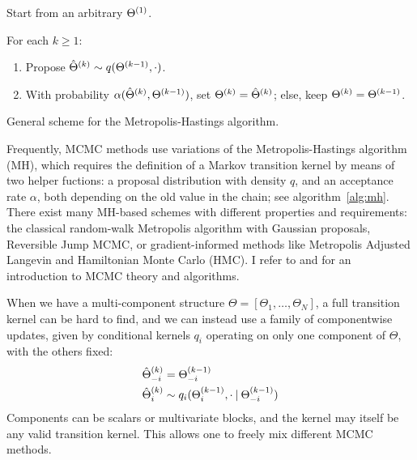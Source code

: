 \begin{algorithm}
  \begin{myalgorithmic}
  \item Start from an arbitrary \(\kth[1]{\Theta}\).
  \item For each \(k \ge 1\):
    \begin{enumerate}
    \item Propose \(\kth[k]{\hat{\Theta}} \sim q(\kth[k-1]{\Theta}, \cdot)\).
    \item With probability \(\alpha(\kth[k]{\hat{\Theta}}, \kth[k-1]{\Theta})\), set
      \(\kth[k]{\Theta} = \kth[k]{\hat{\Theta}}\); else, keep \(\kth[k]{\Theta} = \kth[k-1]{\Theta}\).
    \end{enumerate}
  \end{myalgorithmic}
  \caption{General scheme for the Metropolis-Hastings algorithm.\label{alg:mh}}
\end{algorithm}
Frequently, MCMC methods use variations of the Metropolis-Hastings algorithm (MH), which requires
the definition of a Markov transition kernel by means of two helper fuctions: a proposal
distribution with density \(q\), and an acceptance rate \(\alpha\), both depending on the old value
in the chain; see algorithm~\ref{alg:mh}. There exist many MH-based
schemes with different properties and requirements: the classical random-walk Metropolis algorithm
with Gaussian proposals, Reversible Jump MCMC, or gradient-informed methods like Metropolis Adjusted
Langevin and Hamiltonian Monte Carlo (HMC).  I refer to \textcite[chapter 6]{vihola2020lectures} and
\textcite[chapters 24 and following]{murphy2012machine} for an introduction to MCMC theory and
algorithms.

When we have a multi-component structure \(\Theta = [\Theta_1, \ldots, \Theta_N]\), a full
transition kernel can be hard to find, and we can instead use a family of componentwise updates,
given by conditional kernels \(q_{i}\) operating on only one component of \(\Theta\), with the
others fixed:
\begin{equation}
  \label{eq:conditional-kernels}
  \begin{aligned}
    \kth[k]{\hat{\Theta}}_{-i} &= \kth[k-1]{\Theta}_{-i} \\
    \kth[k]{\hat{\Theta}}_{i} &\sim q_{i}(\kth[k-1]{\Theta}_{i}, \cdot \given \kth[k-1]{\Theta}_{-i})
  \end{aligned}
\end{equation}
Components can be scalars or multivariate blocks, and the kernel may itself be any valid transition
kernel.  This allows one to freely mix different MCMC methods.

